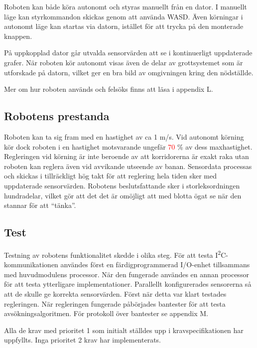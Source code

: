 \documentclass[11pt]{article}
\begin{document}
\begin{flushleft}

Roboten kan både köra autonomt och styras manuellt från en dator. I manuellt läge kan styrkommandon skickas genom att använda WASD. Även körningar i autonomt läge kan startas via datorn, istället för att trycka på den monterade knappen. 

På uppkopplad dator går utvalda sensorvärden att se i kontinuerligt uppdaterade grafer. När roboten kör autonomt visas även de delar av grottsystemet som är utforskade på datorn, vilket ger en bra bild av omgivningen kring den nödställde.

Mer om hur roboten används och felsöks finns att läsa i appendix L.

\subsection{Robotens prestanda}
Roboten kan ta sig fram med en hastighet av ca 1 m/s. Vid autonomt körning kör dock roboten i en hastighet motsvarande ungefär \textcolor{red}{70 }\% av dess maxhastighet. Regleringen vid körning är inte beroende av att korridorerna är exakt raka utan roboten kan reglera även vid avvikande utseende av banan. Sensordata processas och skickas i tillräckligt hög takt för att reglering hela tiden sker med uppdaterade sensorvärden. Robotens beslutsfattande sker i storleksordningen hundradelar, vilket gör att det det är omöjligt att med blotta ögat se när den stannar för att ``tänka''. %

\subsection{Test}
Testning av robotens funktionalitet skedde i olika steg. För att testa I\textsuperscript{2}C-kommunikationen användes först en färdigprogrammerad I/O-enhet tillsammans med huvudmodulens processor. När den fungerade användes en annan processor för att testa ytterligare implementationer. Parallellt konfigurerades sensorerna så att de skulle ge korrekta sensorvärden. Först när detta var klart testades regleringen. När regleringen fungerade påbörjades bantester för att testa avsökningsalgoritmen. För protokoll över bantester se appendix M. 

Alla de krav med prioritet 1 som initialt ställdes upp i kravspecifikationen har uppfyllts. Inga prioritet 2 krav har implementerats.


\end{flushleft}
\end{document}
